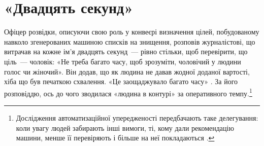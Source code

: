 \chapter{«Двадцять секунд»}
\label{sec:1}
Офіцер розвідки, описуючи свою роль у конвеєрі визначення цілей, побудованому навколо згенерованих машиною списків на знищення, розповів журналістові, що витрачав на кожне ім’я двадцять секунд~— рівно стільки, щоб перевірити, що ціль~— чоловік: «Не треба багато часу, щоб зрозуміти, чоловічий у людини голос чи жіночий». Він додав, що як людина не давав жодної доданої вартості, хіба що був печаткою схвалення. «Це заощаджувало багато часу» \autocite{abraham2024lavender}. За його розповіддю, ось до чого зводилася «людина в контурі» за оперативного темпу.\footnote{Дослідження автоматизаційної упередженості передбачають таке делегування: коли увагу людей забирають інші вимоги, ті, кому дали рекомендацію машини, менше її перевіряють і більше на неї покладаються \autocite{parasuraman2010complacency}.}

